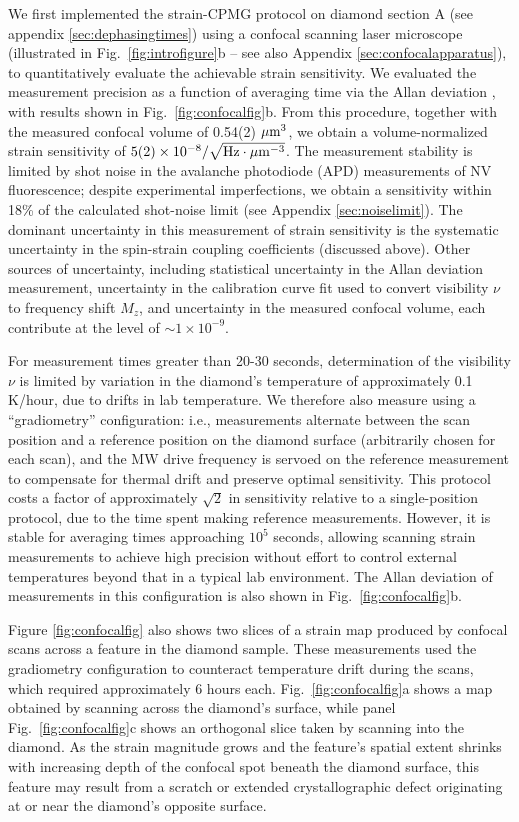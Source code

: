 \documentclass[reprint,superscriptaddress,hyphens,amsmath,amssymb,aps,prx,float]{revtex4-2}
\begin{document}
We first implemented the strain-CPMG protocol on diamond section A (see appendix \ref{sec:dephasingtimes}) using a confocal scanning laser microscope (illustrated in Fig.~\ref{fig:introfigure}b -- see also Appendix \ref{sec:confocalapparatus}), to quantitatively evaluate the achievable strain sensitivity. We evaluated the measurement precision as a function of averaging time via the Allan deviation \cite{AllanDeviation1966}, with results shown in Fig.~\ref{fig:confocalfig}b.  From this procedure, together with the measured confocal volume of 0.54(2) ${\rm \mu m^3}$, we obtain a volume-normalized strain sensitivity of $5(2)\times10^{-8} /\sqrt{\rm Hz \cdot \mu m^{-3}}$.  The measurement stability is limited by shot noise in the avalanche photodiode (APD) measurements of NV fluorescence; despite experimental imperfections, we obtain a sensitivity within 18\% of the calculated shot-noise limit (see Appendix \ref{sec:noiselimit}).  The dominant uncertainty in this measurement of strain sensitivity is the systematic uncertainty in the spin-strain coupling coefficients (discussed above).  Other sources of uncertainty, including statistical uncertainty in the Allan deviation measurement, uncertainty in the calibration curve fit used to convert visibility $\nu$ to frequency shift $M_z$, and uncertainty in the measured confocal volume, each contribute at the level of $\sim1\times10^{-9}.$

For measurement times greater than 20-30 seconds, determination of the visibility $\nu$ is limited by variation in the diamond's temperature of approximately 0.1 K/hour, due to drifts in lab temperature.  We therefore also measure using a ``gradiometry'' configuration: i.e., measurements alternate between the scan position and a reference position on the diamond surface (arbitrarily chosen for each scan), and the MW drive frequency is servoed on the reference measurement to compensate for thermal drift and preserve optimal sensitivity.  This protocol costs a factor of approximately $\sqrt{2}$ in sensitivity relative to a single-position protocol, due to the time spent making reference measurements.  However, it is stable for averaging times approaching $10^5$ seconds, allowing scanning strain measurements to achieve high precision without effort to control external temperatures beyond that in a typical lab environment.  The Allan deviation of measurements in this configuration is also shown in Fig.~\ref{fig:confocalfig}b. 

Figure \ref{fig:confocalfig} also shows two slices of a strain map produced by confocal scans across a feature in the diamond sample.  These measurements used the gradiometry configuration to counteract temperature drift during the scans, which required approximately 6 hours each.  Fig.~\ref{fig:confocalfig}a shows a map obtained by scanning across the diamond's surface, while panel Fig.~\ref{fig:confocalfig}c shows an orthogonal slice taken by scanning into the diamond.  As the strain magnitude grows and the feature's spatial extent shrinks with increasing depth of the confocal spot beneath the diamond surface, this feature may result from a scratch or extended crystallographic defect originating at or near the diamond's opposite surface.  
\end{document}
